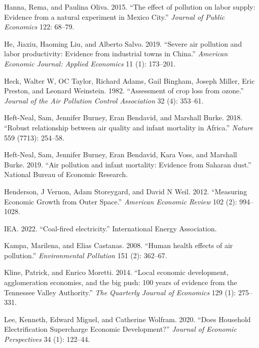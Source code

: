 \documentclass[
]{article}
\newlength{\cslhangindent}
\newlength{\cslentryspacingunit} %
\newenvironment{CSLReferences}[2] %
 {%
  \setlength{\parindent}{0pt}
  \ifodd #1
  \let\oldpar\par
  \def\par{\hangindent=\cslhangindent\oldpar}
  \fi
  \setlength{\parskip}{#2\cslentryspacingunit}
 }%
 {}
\begin{document}
\begin{CSLReferences}{1}{0}
\leavevmode{}%
Hanna, Rema, and Paulina Oliva. 2015. {``{The effect of pollution on labor supply: Evidence from a natural experiment in Mexico City}.''} \emph{{Journal of Public Economics}} 122: 68--79.

\leavevmode{}%
He, Jiaxiu, Haoming Liu, and Alberto Salvo. 2019. {``{Severe air pollution and labor productivity: Evidence from industrial towns in China}.''} \emph{{American Economic Journal: Applied Economics}} 11 (1): 173--201.

\leavevmode{}%
Heck, Walter W, OC Taylor, Richard Adams, Gail Bingham, Joseph Miller, Eric Preston, and Leonard Weinstein. 1982. {``{Assessment of crop loss from ozone}.''} \emph{{Journal of the Air Pollution Control Association}} 32 (4): 353--61.

\leavevmode{}%
Heft-Neal, Sam, Jennifer Burney, Eran Bendavid, and Marshall Burke. 2018. {``{Robust relationship between air quality and infant mortality in Africa}.''} \emph{Nature} 559 (7713): 254--58.

\leavevmode{}%
Heft-Neal, Sam, Jennifer Burney, Eran Bendavid, Kara Voss, and Marshall Burke. 2019. {``{Air pollution and infant mortality: Evidence from Saharan dust}.''} {National Bureau of Economic Research}.

\leavevmode{}%
Henderson, J Vernon, Adam Storeygard, and David N Weil. 2012. {``Measuring Economic Growth from Outer Space.''} \emph{{American Economic Review}} 102 (2): 994--1028.

\leavevmode{}%
IEA. 2022. {``{Coal-fired electricity}.''} {International Energy Association}.

\leavevmode{}%
Kampa, Marilena, and Elias Castanas. 2008. {``{Human health effects of air pollution}.''} \emph{{Environmental Pollution}} 151 (2): 362--67.

\leavevmode{}%
Kline, Patrick, and Enrico Moretti. 2014. {``{Local economic development, agglomeration economies, and the big push: 100 years of evidence from the Tennessee Valley Authority}.''} \emph{The Quarterly Journal of Economics} 129 (1): 275--331.

\leavevmode{}%
Lee, Kenneth, Edward Miguel, and Catherine Wolfram. 2020. {``Does Household Electrification Supercharge Economic Development?''} \emph{{Journal of Economic Perspectives}} 34 (1): 122--44.


\end{CSLReferences}
\end{document}
